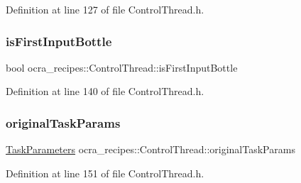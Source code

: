 Definition at line 127 of file Control\+Thread.\+h.

\hypertarget{classocra__recipes_1_1ControlThread_ae459f7c503830d9ae1c0015d8613ea87}{}\label{classocra__recipes_1_1ControlThread_ae459f7c503830d9ae1c0015d8613ea87} 
\subsubsection{\texorpdfstring{is\+First\+Input\+Bottle}{isFirstInputBottle}}
{\footnotesize\ttfamily bool ocra\+\_\+recipes\+::\+Control\+Thread\+::is\+First\+Input\+Bottle\hspace{0.3cm}{\ttfamily [protected]}}



Definition at line 140 of file Control\+Thread.\+h.

\hypertarget{classocra__recipes_1_1ControlThread_a352038d00d429ce8e1ef5defb88005cd}{}\label{classocra__recipes_1_1ControlThread_a352038d00d429ce8e1ef5defb88005cd} 
\subsubsection{\texorpdfstring{original\+Task\+Params}{originalTaskParams}}
{\footnotesize\ttfamily \hyperlink{classocra__recipes_1_1TaskParameters}{Task\+Parameters} ocra\+\_\+recipes\+::\+Control\+Thread\+::original\+Task\+Params\hspace{0.3cm}{\ttfamily [protected]}}



Definition at line 151 of file Control\+Thread.\+h.

\hypertarget{classocra__recipes_1_1ControlThread_acf573eaf6f1d78918b95cabfb110bbaa}{}\label{classocra__recipes_1_1ControlThread_acf573eaf6f1d78918b95cabfb110bbaa} 
